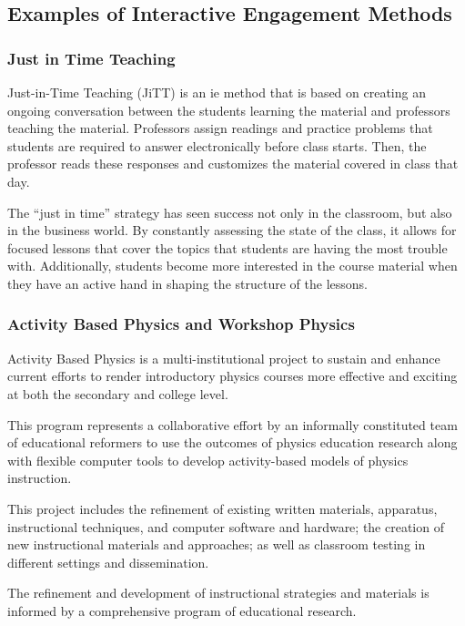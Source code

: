 \subsection{Examples of Interactive Engagement Methods}

\subsubsection{Just in Time Teaching}

Just-in-Time Teaching (JiTT) is an \gls{ie} method that is based on creating an ongoing conversation between the students learning the material and professors teaching the material. Professors assign readings and practice problems that students are required to answer electronically before class starts. Then, the professor reads these responses and customizes the material covered in class that day\cite{novak1999}.

The ``just in time'' strategy has seen success not only in the classroom, but also in the business world. By constantly assessing the state of the class, it allows for focused lessons that cover the topics that students are having the most trouble with. Additionally, students become more interested in the course material when they have an active hand in shaping the structure of the lessons.

\subsubsection{Activity Based Physics and Workshop Physics}

Activity Based Physics is a multi-institutional project to sustain and enhance current efforts to render introductory physics courses more effective and exciting at both the secondary and college level.

This program represents a collaborative effort by an informally constituted team of educational reformers to use the outcomes of physics education research along with flexible computer tools to develop activity-based models of physics instruction.

This project includes the refinement of existing written materials, apparatus, instructional techniques, and computer software and hardware; the creation of new instructional materials and approaches; as well as classroom testing in different settings and dissemination.

The refinement and development of instructional strategies and materials is informed by a comprehensive program of educational research.

